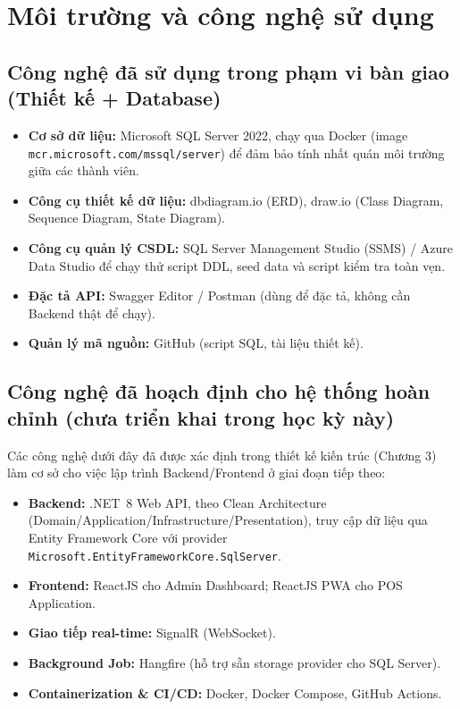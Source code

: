 \section{Môi trường và công nghệ sử dụng}

\subsection{Công nghệ đã sử dụng trong phạm vi bàn giao (Thiết kế + Database)}
\begin{itemize}
    \item \textbf{Cơ sở dữ liệu:} Microsoft SQL Server 2022, chạy qua Docker (image \texttt{mcr.microsoft.com/mssql/server}) để đảm bảo tính nhất quán môi trường giữa các thành viên.
    \item \textbf{Công cụ thiết kế dữ liệu:} dbdiagram.io (ERD), draw.io (Class Diagram, Sequence Diagram, State Diagram).
    \item \textbf{Công cụ quản lý CSDL:} SQL Server Management Studio (SSMS) / Azure Data Studio để chạy thử script DDL, seed data và script kiểm tra toàn vẹn.
    \item \textbf{Đặc tả API:} Swagger Editor / Postman (dùng để đặc tả, không cần Backend thật để chạy).
    \item \textbf{Quản lý mã nguồn:} GitHub (script SQL, tài liệu thiết kế).
\end{itemize}

\subsection{Công nghệ đã hoạch định cho hệ thống hoàn chỉnh (chưa triển khai trong học kỳ này)}
Các công nghệ dưới đây đã được xác định trong thiết kế kiến trúc (Chương 3) làm cơ sở cho việc lập trình Backend/Frontend ở giai đoạn tiếp theo:
\begin{itemize}
    \item \textbf{Backend:} .NET~8 Web API, theo Clean Architecture (Domain/Application/Infrastructure/Presentation), truy cập dữ liệu qua Entity Framework Core với provider \texttt{Microsoft.EntityFrameworkCore\allowbreak.SqlServer}.
    \item \textbf{Frontend:} ReactJS cho Admin Dashboard; ReactJS PWA cho POS Application.
    \item \textbf{Giao tiếp real-time:} SignalR (WebSocket).
    \item \textbf{Background Job:} Hangfire (hỗ trợ sẵn storage provider cho SQL Server).
    \item \textbf{Containerization \& CI/CD:} Docker, Docker Compose, GitHub Actions.
\end{itemize}

